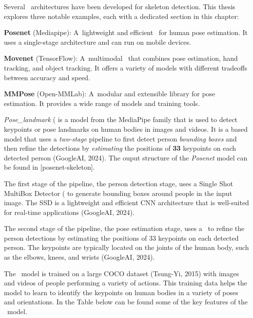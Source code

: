 Several \NN\ architectures have been developed for skeleton detection. This thesis explores three notable examples, each with a dedicated section in this chapter:

\startitemize[n]
    \item {\bf Posenet} (Mediapipe): A~lightweight and efficient \NN\ for human pose estimation. It uses a single-stage architecture and can run on mobile devices.
    \item {\bf Movenet} (TensorFlow): A~multimodal \NN\ that combines pose estimation, hand tracking, and object tracking. It offers a variety of models with different tradeoffs between accuracy and speed.
    \item {\bf MMPose} (Open-MMLab): A~modular and extensible library for pose estimation. It provides a wide range of models and training tools.
\stopitemize

{\em Pose_landmark} (\Posenet\) is a model from the MediaPipe family that is used to detect keypoints or pose landmarks on human bodies in images and videos. It is a \CNN\-based model that uses a {\em two-stage} pipeline to first detect person {\em bounding boxes} and then refine the detections by {\em estimating} the positions of {\bf 33} keypoints on each detected person (\scc GoogleAI, 2024). The ouput structure of the {\em Posenet} model can be found in [posenet-skeleton].

The first stage of the pipeline, the person detection stage, uses a Single Shot MultiBox Detector (\SSD\) to generate bounding boxes around people in the input image. The SSD is a lightweight and efficient CNN architecture that is well-suited for real-time applications (\scc GoogleAI, 2024).

The second stage of the pipeline, the pose estimation stage, uses a \CNN\ to refine the person detections by estimating the positions of 33 keypoints on each detected person. The keypoints are typically located on the joints of the human body, such as the elbows, knees, and wrists (\scc GoogleAI, 2024).

The \Posenet\ model is trained on a large COCO dataset (\scc Tsung-Yi, 2015) with images and videos of people performing a variety of actions. This training data helps the model to learn to identify the keypoints on human bodies in a variety of poses and orientations. In the Table below can be found some of the key features of the \Posenet\ model.


